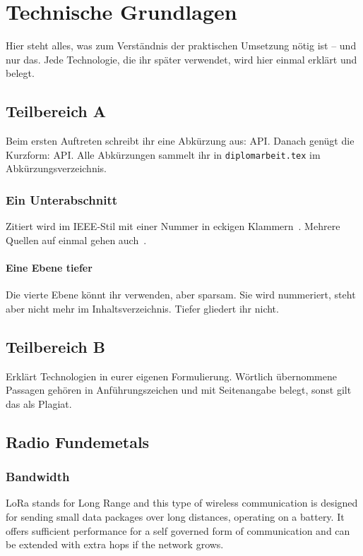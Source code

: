 \chapter{Technische Grundlagen}

Hier steht alles, was zum Verständnis der praktischen Umsetzung nötig ist --
und nur das. Jede Technologie, die ihr später verwendet, wird hier einmal
erklärt und belegt.

\section{Teilbereich A}

Beim ersten Auftreten schreibt ihr eine Abkürzung aus: \ac{API}. Danach
genügt die Kurzform: \ac{API}. Alle Abkürzungen sammelt ihr in
\texttt{diplomarbeit.tex} im Abkürzungsverzeichnis.

\subsection{Ein Unterabschnitt}

Zitiert wird im IEEE-Stil mit einer Nummer in eckigen
Klammern~\cite{beispiel-artikel}. Mehrere Quellen auf einmal gehen
auch~\cite{beispiel-buch,beispiel-online}.

\subsubsection{Eine Ebene tiefer}

Die vierte Ebene könnt ihr verwenden, aber sparsam. Sie wird nummeriert,
steht aber nicht mehr im Inhaltsverzeichnis. Tiefer gliedert ihr nicht.

\section{Teilbereich B}

Erklärt Technologien in eurer eigenen Formulierung. Wörtlich übernommene
Passagen gehören in Anführungszeichen und mit Seitenangabe belegt, sonst gilt
das als Plagiat.

\pagebreak
\section{Radio Fundemetals}
\subsection{Bandwidth}
LoRa stands for Long Range and this type of wireless communication is designed for sending small data packages over long distances, operating on a battery. It offers sufficient performance for a self governed form of communication and can be extended with extra hops if the network grows.  


